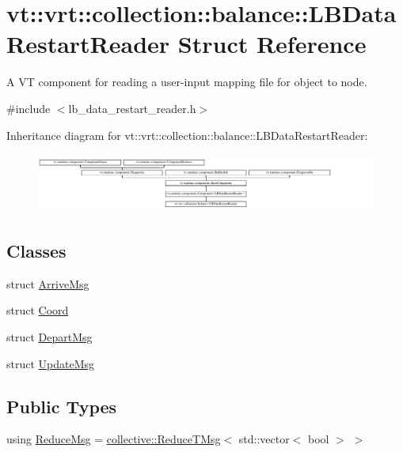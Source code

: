 \hypertarget{structvt_1_1vrt_1_1collection_1_1balance_1_1_l_b_data_restart_reader}{}\section{vt\+:\+:vrt\+:\+:collection\+:\+:balance\+:\+:L\+B\+Data\+Restart\+Reader Struct Reference}
\label{structvt_1_1vrt_1_1collection_1_1balance_1_1_l_b_data_restart_reader}


A VT component for reading a user-\/input mapping file for object to node.  




{\ttfamily \#include $<$lb\+\_\+data\+\_\+restart\+\_\+reader.\+h$>$}

Inheritance diagram for vt\+:\+:vrt\+:\+:collection\+:\+:balance\+:\+:L\+B\+Data\+Restart\+Reader\+:\begin{figure}[H]
\begin{center}
\leavevmode
\includegraphics[height=1.955307cm]{structvt_1_1vrt_1_1collection_1_1balance_1_1_l_b_data_restart_reader}
\end{center}
\end{figure}
\subsection*{Classes}
\begin{DoxyCompactItemize}
\item 
struct \hyperlink{structvt_1_1vrt_1_1collection_1_1balance_1_1_l_b_data_restart_reader_1_1_arrive_msg}{Arrive\+Msg}
\item 
struct \hyperlink{structvt_1_1vrt_1_1collection_1_1balance_1_1_l_b_data_restart_reader_1_1_coord}{Coord}
\item 
struct \hyperlink{structvt_1_1vrt_1_1collection_1_1balance_1_1_l_b_data_restart_reader_1_1_depart_msg}{Depart\+Msg}
\item 
struct \hyperlink{structvt_1_1vrt_1_1collection_1_1balance_1_1_l_b_data_restart_reader_1_1_update_msg}{Update\+Msg}
\end{DoxyCompactItemize}
\subsection*{Public Types}
\begin{DoxyCompactItemize}
\item 
using \hyperlink{structvt_1_1vrt_1_1collection_1_1balance_1_1_l_b_data_restart_reader_a59e2b9e568683c89c9af430adacba420}{Reduce\+Msg} = \hyperlink{namespacevt_1_1collective_a28b82d5d48c9bc6e4fd738fcbf9e0f62}{collective\+::\+Reduce\+T\+Msg}$<$ std\+::vector$<$ bool $>$ $>$
\end{DoxyCompactItemize}
